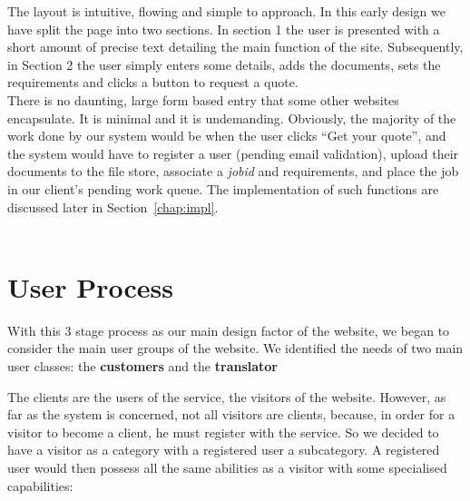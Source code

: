 \documentclass{l3proj}
\begin{document}
The layout is intuitive, flowing and simple to approach. In this early design we have split the page into two sections. In section 1 the user is presented with a short amount of precise text detailing the main function of the site. Subsequently, in Section 2 the user simply enters some details, adds the documents, sets the requirements and clicks a button to request a quote. \\There is no daunting, large form based entry that some other websites encapsulate. It is minimal and it is undemanding. Obviously, the majority of the work done by our system would be when the user clicks ``Get your quote'', and the system would have to register a user (pending email validation), upload their documents to the file store, associate a \textit{jobid} and requirements, and place the job in our client's pending work queue. The implementation of such functions are discussed later in Section~\ref{chap:impl}.\\
\\


\section{User Process}
\label{sect:user-process}
With this 3 stage process as our main design factor of the website, we began to consider the main user groups of the website. We identified the needs of two main user classes: the \textbf{customers} and the \textbf{translator}

The clients are the users of the service, the visitors of the website. However, as far as the system is concerned, not all visitors are clients, because, in order for a visitor to become a client, he must register with the service. So we decided to have a visitor as a category with a registered user a subcategory. A registered user would then possess all the same abilities as a visitor with some specialised capabilities:
\end{document}
